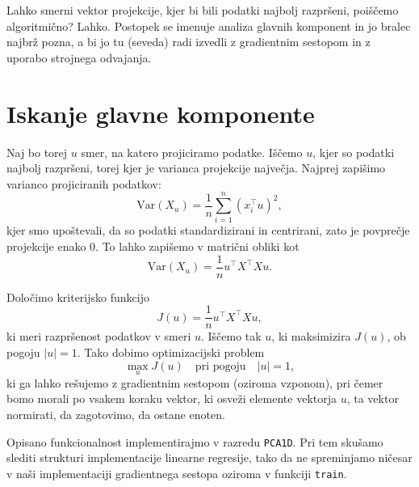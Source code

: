Lahko smerni vektor projekcije, kjer bi bili podatki najbolj razpršeni, poiščemo algoritmično? Lahko. Postopek se imenuje analiza glavnih komponent in jo bralec najbrž pozna, a bi jo tu (seveda) radi izvedli z gradientnim sestopom in z uporabo strojnega odvajanja.

\section{Iskanje glavne komponente}

Naj bo torej $u$ smer, na katero projiciramo podatke. Iščemo $u$, kjer so podatki najbolj razpršeni, torej kjer je varianca projekcije največja. Najprej zapišimo varianco projiciranih podatkov:
$$
\mathrm{Var}(X_u)=\frac{1}{n}\sum_{i=1}^n (x_i^\top u)^2,
$$
kjer smo upoštevali, da so podatki standardizirani in centrirani, zato je povprečje projekcije enako $0$. To lahko zapišemo v matrični obliki kot
$$
\mathrm{Var}(X_u)=\frac{1}{n} u^\top X^\top X u.
$$

Določimo kriterijsko funkcijo
$$
J(u)=\frac{1}{n} u^\top X^\top X u,
$$
ki meri razpršenost podatkov v smeri $u$. Iščemo tak $u$, ki maksimizira $J(u)$, ob pogoju $|u|=1$. Tako dobimo optimizacijski problem
$$
\max_u J(u) \quad \text{pri pogoju} \quad |u|=1,
$$
ki ga lahko rešujemo z gradientnim sestopom (oziroma vzponom), pri čemer bomo morali po vsakem koraku vektor, ki osveži elemente vektorja $u$, ta vektor normirati, da zagotovimo, da ostane enoten.

Opisano funkcionalnost implementirajmo v razredu \texttt{PCA1D}. Pri tem skušamo slediti strukturi implementacije linearne regresije, tako da ne spreminjamo ničesar v naši implementaciji gradientnega sestopa oziroma v funkciji \texttt{train}.

